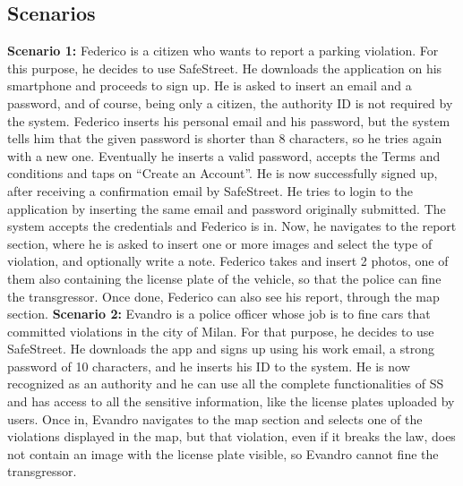 \documentclass[../RASD.tex]{subfiles}
\begin{document}
            \subsection{Scenarios}\label{subsec:scenarios}
                \textbf{Scenario 1:} Federico is a citizen who wants to report a parking violation.
                For this purpose, he decides to use SafeStreet.
                He downloads the application on his smartphone and proceeds to sign up.
                He is asked to insert an email and a password, and of course, being only a citizen, the authority ID is not required by the system.
                Federico inserts his personal email and his password, but the system tells him that the given password is shorter than 8 characters,
                so he tries again with a new one.
                Eventually he inserts a valid password, accepts the Terms and conditions and taps on “Create an Account”.
                He is now successfully signed up, after receiving a confirmation email by SafeStreet.
                He tries to login to the application by inserting the same email
                and password originally submitted.
                The system accepts the credentials and Federico is in.
                Now, he navigates to the report section, where he is asked to
                insert one or more images and select the type of violation, and optionally write a note.
                Federico takes and insert 2 photos, one of them also containing
                the license plate of the vehicle, so that the police can fine the transgressor.
                Once done, Federico can also see his report, through the map section.
                \newline
                \newline
                \textbf{Scenario 2:} Evandro is a police officer whose job is to fine cars that committed violations in the city of Milan.
                For that purpose, he decides to use SafeStreet.
                He downloads the app and signs up using his work email, a strong password of 10 characters, and he inserts his ID to the system.
                He is now recognized as an authority and he can use all the complete functionalities of SS and has access to all the sensitive information,
                like the license plates uploaded by users.
                Once in, Evandro navigates to the map section and selects one of the violations displayed in the map, but that violation,
                even if it breaks the law, does not contain an image with the license plate visible, so Evandro cannot fine the transgressor.
\end{document}

